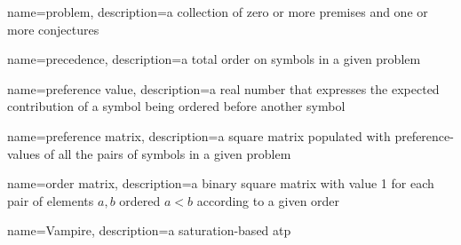 \usepackage{glossaries}
\makeglossaries


{
	name=problem,
	description={a collection of zero or more premises and one or more conjectures}
}

{
	name=precedence,
	description={a total order on symbols in a given \gls{problem}}
}

{
	name=preference value,
	description={a real number that expresses the expected contribution of a symbol being ordered before another symbol}
}

{
	name=preference matrix,
	description={a square matrix populated with \glspl{preference-value} of all the pairs of symbols in a given \gls{problem}}
}

{
	name=order matrix,
	description={a binary square matrix with value 1 for each pair of elements \(a, b\) ordered \(a < b\) according to a given order}
}

{
	name=Vampire,
	description={a saturation-based \gls{atp} \cite{Kovacs2013}}
}

